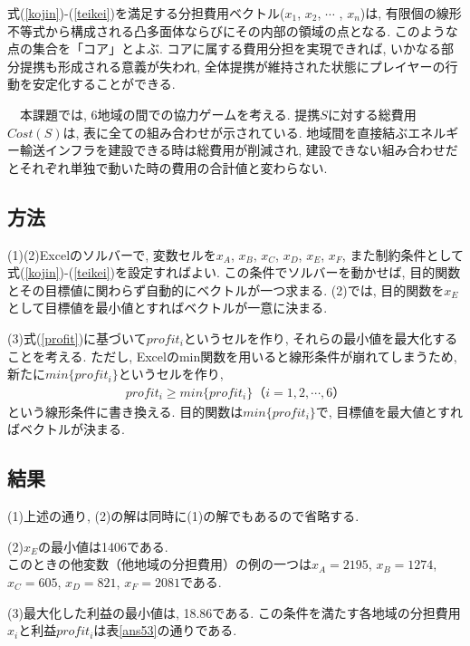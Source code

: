 \documentclass[]{jsarticle}
\begin{document}
      式(\ref{kojin})-(\ref{teikei})を満足する分担費用ベクトル($x_1$, $x_2$, $\cdots$ , $x_n$)は, 有限個の線形不等式から構成される凸多面体ならびにその内部の領域の点となる. このような点の集合を「コア」とよぶ. コアに属する費用分担を実現できれば, いかなる部分提携も形成される意義が失われ, 全体提携が維持された状態にプレイヤーの行動を安定化することができる.

      　本課題では, 6地域の間での協力ゲームを考える. 提携$S$に対する総費用$Cost(S)$は, 表に全ての組み合わせが示されている. 地域間を直接結ぶエネルギー輸送インフラを建設できる時は総費用が削減され, 建設できない組み合わせだとそれぞれ単独で動いた時の費用の合計値と変わらない.


  \subsection{方法}
    (1)(2)Excelのソルバーで, 変数セルを$x_A$, $x_B$, $x_C$, $x_D$, $x_E$, $x_F$, また制約条件として式(\ref{kojin})-(\ref{teikei})を設定すればよい. この条件でソルバーを動かせば, 目的関数とその目標値に関わらず自動的にベクトルが一つ求まる. (2)では, 目的関数を$x_E$として目標値を最小値とすればベクトルが一意に決まる.

    (3)式(\ref{profit})に基づいて$profit_i$というセルを作り, それらの最小値を最大化することを考える. ただし, Excelのmin関数を用いると線形条件が崩れてしまうため, 新たに$min\{profit_i\}$というセルを作り,
       \begin{eqnarray}
         profit_i \ge min\{profit_i\}　（i = 1, 2, \cdots , 6）
       \end{eqnarray}
    という線形条件に書き換える. 目的関数は$min\{profit_i\}$で, 目標値を最大値とすればベクトルが決まる.


  \subsection{結果}
    (1)上述の通り, (2)の解は同時に(1)の解でもあるので省略する.

    (2)$x_E$の最小値は1406である. \\
    このときの他変数（他地域の分担費用）の例の一つは$x_A = 2195$, $x_B = 1274$, $x_C = 605$, $x_D = 821$, $x_F = 2081$である.

    (3)最大化した利益の最小値は, 18.86である. この条件を満たす各地域の分担費用$x_i$と利益$profit_i$は表\ref{ans53}の通りである.
\end{document}
